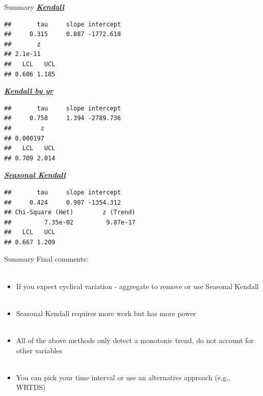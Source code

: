 \documentclass[xcolor=dvipsnames,serif]{beamer}\usepackage[]{graphicx}\usepackage[]{color}
\makeatletter
\newenvironment{kframe}{%
 \def\at@end@of@kframe{}%
 \ifinner\ifhmode%
  \def\at@end@of@kframe{\end{minipage}}%
  \begin{minipage}{\columnwidth}%
 \fi\fi%
 \def\FrameCommand##1{\hskip\@totalleftmargin \hskip-\fboxsep
 \colorbox{shadecolor}{##1}\hskip-\fboxsep
     \hskip-\linewidth \hskip-\@totalleftmargin \hskip\columnwidth}%
 \MakeFramed {\advance\hsize-\width
   \@totalleftmargin\z@ \linewidth\hsize
   \@setminipage}}%
 {\par\unskip\endMakeFramed%
 \at@end@of@kframe}
\newenvironment{knitrout}{}{} %
\newcommand{\Bigtxt}[1]{\textbf{\textit{#1}}}
\makeatother
\begin{document}
\begin{frame}{Summary}{}
\underline{\Bigtxt{Kendall}}
\begin{knitrout}\scriptsize
{}\color{fgcolor}\begin{kframe}
\begin{verbatim}
##       tau     slope intercept 
##     0.315     0.887 -1772.618
##       z 
## 2.1e-11
##   LCL   UCL 
## 0.606 1.185
\end{verbatim}
\end{kframe}
\end{knitrout}
\underline{\Bigtxt{Kendall by yr}}
\begin{knitrout}\scriptsize
{}\color{fgcolor}\begin{kframe}
\begin{verbatim}
##       tau     slope intercept 
##     0.758     1.394 -2789.736
##        z 
## 0.000197
##   LCL   UCL 
## 0.709 2.014
\end{verbatim}
\end{kframe}
\end{knitrout}
\underline{\Bigtxt{Seasonal Kendall}}
\begin{knitrout}\scriptsize
{}\color{fgcolor}\begin{kframe}
\begin{verbatim}
##       tau     slope intercept 
##     0.424     0.907 -1354.312
## Chi-Square (Het)        z (Trend) 
##         7.35e-02         9.87e-17
##   LCL   UCL 
## 0.667 1.209
\end{verbatim}
\end{kframe}
\end{knitrout}
\end{frame}

\begin{frame}{Summary}{}
Final comments: \\~\\
\begin{itemize}
\item<1-> If you expect cyclical variation - aggregate to remove or use Seasonal Kendall \\~\\
\item<2-> Seasonal Kendall requires more work but has more power \\~\\
\item<3-> All of the above methods only detect a monotonic trend, do not account for other variables \\~\\
\item<4-> You can pick your time interval or use an alternative approach (e.g., WRTDS)
\end{itemize}
\end{frame}
\end{document}
